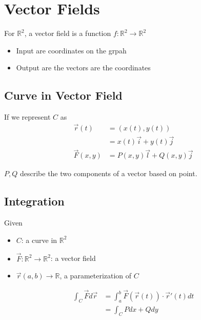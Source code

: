 \section{Vector Fields}

  For $ \mathbb{R}^{2} $, a vector field is a function
  $ f: \mathbb{R}^{2} \to \mathbb{R}^{2} $
  \begin{itemize}
    \item Input are coordinates on the grpah
    \item Output are the vectors are the coordinates
  \end{itemize}

  \subsection{Curve in Vector Field}

    If we represent $ C $ as
    \begin{align*}
      \vec{r}\left( t \right)
        &= \left( x\left(t\right), y\left(t\right) \right) \\
        &= x\left( t \right) \vec{i} + y\left( t \right) \vec{j} \\
      \vec{F}\left( x, y \right)
        &= P\left( x, y \right) \vec{l} + Q\left( x, y \right) \vec{j}
    \end{align*}

    $ P, Q $ describe the two components of a vector based on point.

  \subsection{Integration}

    Given
    \begin{itemize}
      \item $ C $: a curve in $ \mathbb{R}^{2} $
      \item $ \vec{F}: \mathbb{R}^{2} \to \mathbb{R}^{2} $: a vector field
      \item $ \vec{r}\left( a, b \right) \to \mathbb{R} $, a parameterization
      of $ C $
    \end{itemize}

    \begin{align}
      \int_{C} \vec{F} d\vec{r}
        &= \int_{a}^{b} \vec{F}\left( \vec{r} \left( t \right) \right)
        \cdot \vec{r}'\left( t \right) dt \\
        &= \int_{C} P dx + Q dy
    \end{align}

